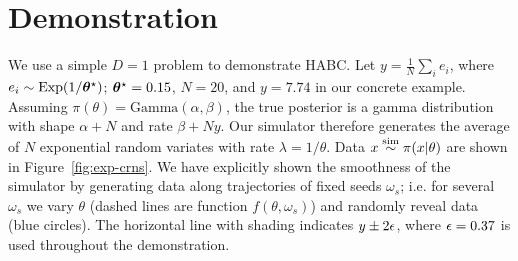 \documentclass[]{article}
\begin{document}
\section{Demonstration}\label{sec:demo}
We use a simple $D=1$ problem to demonstrate HABC.  Let $y= \frac{1}{N} \sum_{i} e_i$, where $e_i \sim \text{Exp}(1/{\bm \theta}^{\star})$; ${\bm \theta}^{\star} = 0.15$, $N=20$, and $y=7.74$ in our concrete example.  Assuming $\pi(\theta ) = \text{Gamma}(\alpha, \beta)$, the true posterior is a gamma distribution with shape $\alpha+N$ and rate $\beta + N y$.  Our simulator therefore generates the average of $N$ exponential random variates with rate $\lambda = 1/\theta$.  Data $x \overset{\operatorname{sim}}{\sim} \pi(x|\theta)$ are shown in Figure~\ref{fig:exp-crns}.  We have explicitly shown the smoothness of the simulator by generating data along trajectories of fixed seeds $\omega_s$; i.e. for several $\omega_s$ we vary $\theta$ (dashed lines are function $f(\theta, \omega_s)$) and randomly reveal data (blue circles).  The horizontal line with shading indicates $y \pm 2 \epsilon$, where $\epsilon = 0.37$ is used throughout the demonstration.
\end{document}
